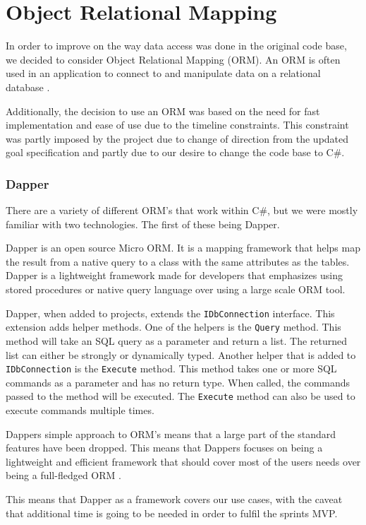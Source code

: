 \section{Object Relational Mapping}
In order to improve on the way data access was done in the original code base, we decided to consider Object Relational Mapping (ORM). An ORM is often used in an application to connect to and manipulate data on a relational database \cite{ORM}. 

Additionally, the decision to use an ORM was based on the need for fast implementation and ease of use due to the timeline constraints. This constraint was partly imposed by the \knox{} project due to change of direction from the updated goal specification and partly due to our desire to change the code base to C\#. 

\subsubsection{Dapper}
There are a variety of different ORM's that work within C\#, but we were mostly familiar with two technologies. The first of these being Dapper.
 
Dapper is an open source Micro ORM. It is a mapping framework that helps map the result from a native query to a class with the same attributes as the tables. Dapper is a lightweight framework made for developers that emphasizes using stored procedures or native query language over using a large scale ORM tool. 


Dapper, when added to projects, extends the \texttt{IDbConnection} interface. This extension adds helper methods. 
One of the helpers is the \texttt{Query} method. This method will take an SQL query as a parameter and return a list. The returned list can either be strongly or dynamically typed.
Another helper that is added to \texttt{IDbConnection} is the \texttt{Execute} method. This method takes one or more SQL commands as a parameter and has no return type. When called, the commands passed to the method will be executed. The \texttt{Execute} method can also be used to execute commands multiple times\cite{Dapper_Git}.

Dappers simple approach to ORM's means that a large part of the standard features have been dropped. This means that Dappers focuses on being a lightweight and efficient framework that should cover most of the users needs over being a full-fledged ORM \cite{Dapper_Git}.

This means that Dapper as a framework covers our use cases, with the caveat that additional time is going to be needed in order to fulfil the sprints MVP. 


